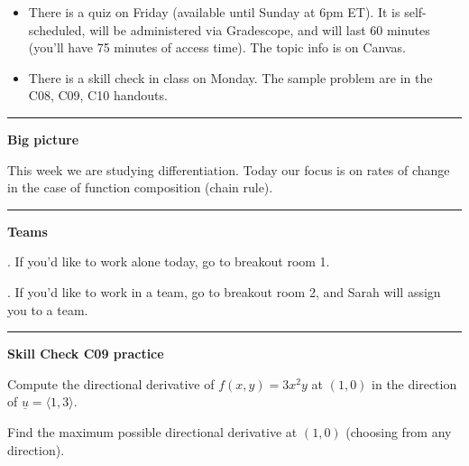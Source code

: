 \documentclass[12pt,letterpaper,noanswers]{exam}
\newcommand{\mb}[1]{\underline{#1}}
\begin{document}
 \pdfpageheight 11in 
  \pdfpagewidth 8.5in





\begin{itemize}
\itemsep0em
    \item There is a quiz on Friday (available until Sunday at 6pm ET).  It is self-scheduled, will be administered via Gradescope, and will last 60 minutes (you'll have 75 minutes of access time).  The topic info is on Canvas.
    \item There is a skill check in class on Monday.  The sample problem are in the C08, C09, C10 handouts.
\end{itemize}

\hrule
\vspace{0.2cm}


\noindent\textbf{Big picture}

This week we are studying differentiation.  Today our focus is on rates of change in the case of function composition (chain rule).

\vspace{0.2cm}
\hrule
\vspace{0.2cm}


\noindent\textbf{Teams}

\begin{multicols}{2}

. If you'd like to work alone today, go to breakout room 1.

. If you'd like to work in a team, go to breakout room 2, and Sarah will assign you to a team.

\end{multicols}

\hrule
\vspace{0.2cm}

\noindent\textbf{Skill Check C09 practice}

\begin{questions}
\item Compute the directional derivative of $f(x,y) = 3x^2y$ at $(1,0)$ in the direction of $\mb{u} = \langle 1,3\rangle$.
\item Find the maximum possible directional derivative at $(1,0)$ (choosing from any direction).
\end{questions}
\end{document}
